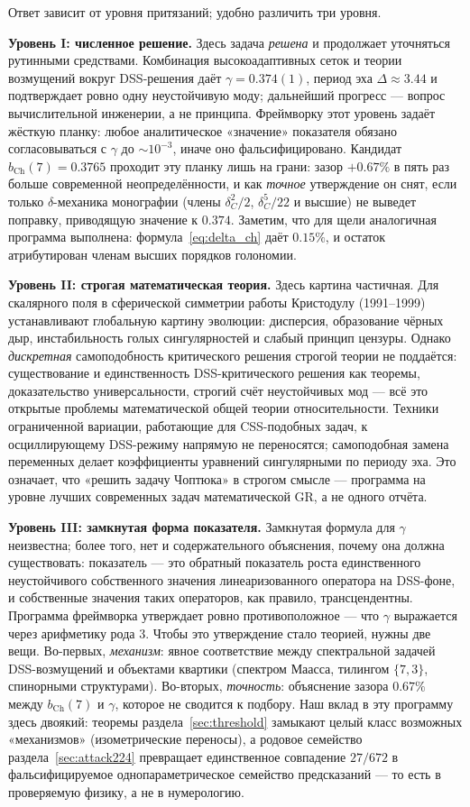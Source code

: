 \documentclass[11pt,a4paper]{article}
\theoremstyle{definition}
\theoremstyle{remark}
\begin{document}
Ответ зависит от уровня притязаний; удобно различить три уровня.

\textbf{Уровень I: численное решение.} Здесь задача \emph{решена} и
продолжает уточняться рутинными средствами. Комбинация высокоадаптивных
сеток и теории возмущений вокруг DSS-решения даёт $\gamma = 0.374(1)$,
период эха $\Delta \approx 3.44$ и подтверждает ровно одну неустойчивую
моду; дальнейший прогресс --- вопрос вычислительной инженерии, а не принципа.
Фреймворку этот уровень задаёт жёсткую планку: любое аналитическое
«значение» показателя обязано согласовываться с $\gamma$ до $\sim 10^{-3}$,
иначе оно фальсифицировано. Кандидат $b_{\mathrm{Ch}}(7) = 0.3765$ проходит
эту планку лишь на грани: зазор $+0.67\%$ в пять раз больше современной
неопределённости, и как \emph{точное} утверждение он снят, если только
$\delta$-механика монографии (члены $\delta_C^2/2$, $\delta_C^5/22$ и высшие)
не выведет поправку, приводящую значение к $0.374$. Заметим, что для щели
аналогичная программа выполнена: формула~\eqref{eq:delta_ch} даёт $0.15\%$,
и остаток атрибутирован членам высших порядков голономии.

\textbf{Уровень II: строгая математическая теория.} Здесь картина частичная.
Для скалярного поля в сферической симметрии работы Кристодулу (1991--1999)
устанавливают глобальную картину эволюции: дисперсия, образование чёрных дыр,
инстабильность голых сингулярностей и слабый принцип цензуры. Однако
\emph{дискретная} самоподобность критического решения строгой теории не
поддаётся: существование и единственность DSS-критического решения как
теоремы, доказательство универсальности, строгий счёт неустойчивых мод ---
всё это открытые проблемы математической общей теории относительности.
Техники ограниченной вариации, работающие для CSS-подобных задач, к
осциллирующему DSS-режиму напрямую не переносятся; самоподобная замена
переменных делает коэффициенты уравнений сингулярными по периоду эха. Это
означает, что «решить задачу Чоптюка» в строгом смысле --- программа на
уровне лучших современных задач математической GR, а не одного отчёта.

\textbf{Уровень III: замкнутая форма показателя.} Замкнутая формула для
$\gamma$ неизвестна; более того, нет и содержательного объяснения, почему она
должна существовать: показатель --- это обратный показатель роста
единственного неустойчивого собственного значения линеаризованного оператора
на DSS-фоне, и собственные значения таких операторов, как правило,
трансцендентны. Программа фреймворка утверждает ровно противоположное ---
что $\gamma$ выражается через арифметику рода 3. Чтобы это утверждение стало
теорией, нужны две вещи. Во-первых, \emph{механизм}: явное соответствие между
спектральной задачей DSS-возмущений и объектами квартики (спектром Маасса,
тилингом $\{7,3\}$, спинорными структурами). Во-вторых, \emph{точность}:
объяснение зазора $0.67\%$ между $b_{\mathrm{Ch}}(7)$ и $\gamma$, которое не
сводится к подбору. Наш вклад в эту программу здесь двоякий: теоремы
раздела~\ref{sec:threshold} замыкают целый класс возможных «механизмов»
(изометрические переносы), а родовое семейство
раздела~\ref{sec:attack224} превращает единственное совпадение $27/672$ в
фальсифицируемое однопараметрическое семейство предсказаний --- то есть в
проверяемую физику, а не в нумерологию.
\end{document}
